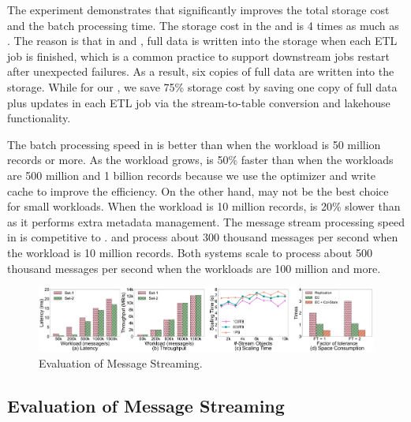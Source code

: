 The experiment demonstrates that \sys significantly improves the total storage cost and the batch processing time. The storage cost in the \hdfs and \kafka  is 4 times as much as \sys. The reason is that in \hdfs and \kafka, full data is written into the storage when each ETL job is finished, which is a common practice to support downstream jobs restart after unexpected failures. As a result, six copies of full data are written into the storage. 
While for our \sys, we save 75\%  storage cost by saving one copy of full data plus updates in each ETL job via the stream-to-table conversion and lakehouse functionality.

The batch processing speed in \sys is better than \hdfs when the workload is 50 million records or more.  As the workload grows,  \sys is 50\% faster than \hdfs when the workloads are 500 million and 1 billion records because we use the \brain optimizer and  write cache to improve the efficiency.
 On the other hand, \sys may not be the best choice for small workloads. When the workload is 10 million records, \sys is 20\% slower than \hdfs as it performs extra metadata management.
The message stream processing speed in \sys is competitive to \kafka. \sys and \kafka process about 300 thousand messages per second when the workload is 10 million records. Both systems scale to process about 500 thousand messages per second when the workloads are 100 million and more. 


\begin{figure}
	\centering
	\includegraphics[width=\textwidth]{figures/streamengine}
	\caption{Evaluation of Message Streaming.}
	\label{fig:streamengine}
\end{figure}



\subsection{Evaluation of Message Streaming}

